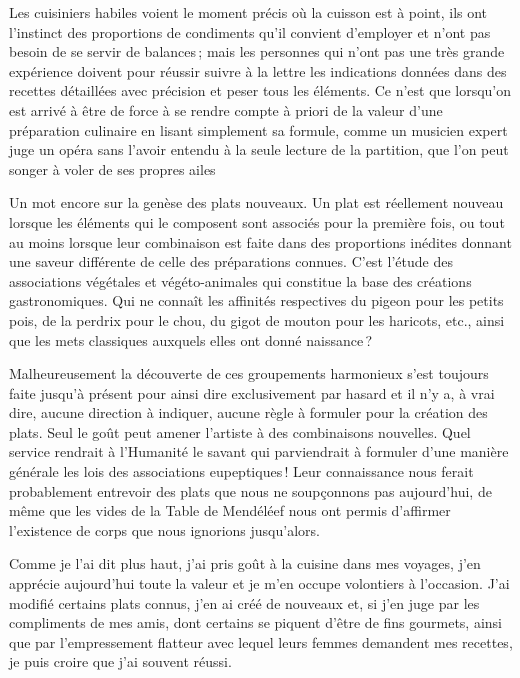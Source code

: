 \begin{itshape}
Les cuisiniers habiles voient le moment précis où la cuisson est à point, ils
ont l'instinct des proportions de condiments qu'il convient d'employer et n'ont
pas besoin de se servir de balances ; mais les personnes qui n'ont pas une très
grande expérience doivent pour réussir suivre à la lettre les indications
données dans des recettes détaillées avec précision et peser tous les éléments.
Ce n'est que lorsqu'on est arrivé à être de force à se rendre compte à priori
de la valeur d’une préparation culinaire en lisant simplement sa formule, comme
un musicien expert juge un opéra sans l'avoir entendu à la seule lecture de la
partition, que l'on peut songer à voler de ses propres ailes

Un mot encore sur la genèse des plats nouveaux. Un plat est réellement nouveau
lorsque les éléments qui le composent sont associés pour la première fois, ou tout au
moins lorsque leur combinaison est faite dans des proportions inédites donnant une
saveur différente de celle des préparations connues. C'est l'étude des associations
végétales et végéto-animales qui constitue la base des créations gastronomiques. Qui
ne connaît les affinités respectives du pigeon pour les petits pois, de la perdrix pour
le chou, du gigot de mouton pour les haricots, etc., ainsi que les mets classiques
auxquels elles ont donné naissance ?

Malheureusement la découverte de ces groupements harmonieux s'est toujours
faite jusqu'à présent pour ainsi dire exclusivement par hasard et il n'y a, à vrai dire,
aucune direction à indiquer, aucune règle à formuler pour la création des plats. Seul
le goût peut amener l'artiste à des combinaisons nouvelles. Quel service rendrait à
l'Humanité le savant qui parviendrait à formuler d'une manière générale les lois des
associations eupeptiques ! Leur connaissance nous ferait probablement entrevoir des
plats que nous ne soupçonnons pas aujourd'hui, de même que les vides de la Table de
Mendéléef nous ont permis d'affirmer l'existence de corps que nous ignorions jusqu'alors.

Comme je l'ai dit plus haut, j'ai pris goût à la cuisine dans mes voyages, j'en
apprécie aujourd'hui toute la valeur et je m'en occupe volontiers à l'occasion. J'ai
modifié certains plats connus, j'en ai créé de nouveaux et, si j'en juge par les
compliments de mes amis, dont certains se piquent d'être de fins gourmets, ainsi que
par l'empressement flatteur avec lequel leurs femmes demandent mes recettes, je puis
croire que j'ai souvent réussi.


\end{itshape}
